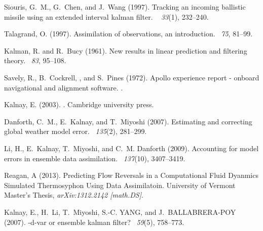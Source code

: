 \documentclass[onecolumn]{article}
\begin{document}
\begin{multicols}{2}
\begin{thebibliography}{9}
        Siouris, G.~M., G.~Chen, and J.~Wang (1997).
        \newblock Tracking an incoming ballistic missile using an extended interval
          kalman filter.
        ~{\em
          33\/}(1), 232--240.
        
        Talagrand, O. (1997).
        \newblock Assimilation of observations, an introduction.
        ~{\em 75},
          81--99.
        
        Kalman, R. and R.~Bucy (1961).
        \newblock New results in linear prediction and filtering theory.
        ~{\em 83}, 95--108.
        
        Savely, R., B.~Cockrell, , and S.~Pines (1972).
        \newblock Apollo experience report - onboard navigational and alignment
          software.
        .
        
        Kalnay, E. (2003).
        .
        \newblock Cambridge university press.
        
        Danforth, C.~M., E.~Kalnay, and T.~Miyoshi (2007).
        \newblock Estimating and correcting global weather model error.
        ~{\em 135\/}(2), 281--299.
        
        Li, H., E.~Kalnay, T.~Miyoshi, and C.~M. Danforth (2009).
        \newblock Accounting for model errors in ensemble data assimilation.
        ~{\em 137\/}(10), 3407--3419.

        Reagan, A (2013).
        \newblock Predicting Flow Reversals in a Computational Fluid Dyanmics Simulated Thermosyphon Using Data Assimilatoin.
        \newblock University of Vermont Master's Thesis, {\em arXiv:1312.2142 [math.DS]}.

        Kalnay, E., H.~Li, T.~Miyoshi, S.-C. YANG, and J.~BALLABRERA-POY (2007).
        -d-var or ensemble kalman filter?
        ~{\em 59\/}(5), 758--773.


\end{thebibliography}
\end{multicols}
\end{document}
